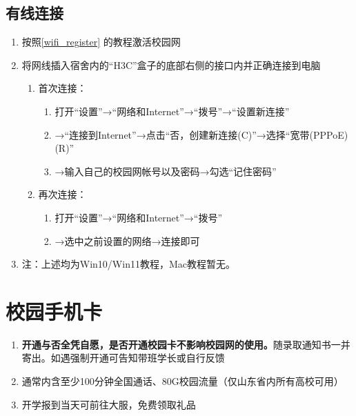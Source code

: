 \subsection[有线连接]{有线连接}
\begin{enumerate}
      \item 按照\uline{\ref{wifi_register}} 的教程激活校园网
      \item 将网线插入宿舍内的“H3C”盒子的底部右侧的接口内并正确连接到电脑\footnotemark
            \begin{enumerate}
                  \item 首次连接：
                        \begin{enumerate}
                              \item 打开“设置”→“网络和Internet”→“拨号”→“设置新连接”
                              \item →“连接到Internet”→点击“否，创建新连接(C)”→选择“宽带(PPPoE)(R)”
                              \item →输入自己的校园网帐号以及密码→勾选“记住密码”
                        \end{enumerate}
                  \item 再次连接：
                        \begin{enumerate}
                              \item 打开“设置”→“网络和Internet”→“拨号”
                              \item →选中之前设置的网络→连接即可
                        \end{enumerate}
            \end{enumerate}
      \item  注：上述均为Win10/Win11教程，Mac教程暂无。
\end{enumerate}

\section[校园手机卡]{校园手机卡}
\begin{enumerate}
      \item \textbf{开通与否全凭自愿，是否开通校园卡不影响校园网的使用。}随录取通知书一并寄出。如遇强制开通可告知带班学长或自行反馈
      \item 通常内含至少100分钟全国通话、80G校园流量（仅山东省内所有高校可用）\footnotemark
      \item 开学报到当天可前往大服，免费领取礼品
\end{enumerate}

